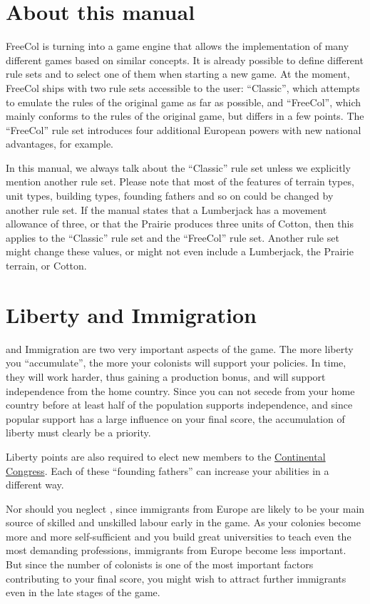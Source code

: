 \documentclass[12pt]{book}
\begin{document}
\hypertarget{About this manual}{\section{About this manual}}

FreeCol is turning into a game engine that allows the implementation
of many different games based on similar concepts. It is already
possible to define different rule sets and to select one of them when
starting a new game. At the moment, FreeCol ships with two rule sets
accessible to the user: ``Classic'', which attempts to emulate the
rules of the original game as far as possible, and ``FreeCol'', which
mainly conforms to the rules of the original game, but differs in a
few points. The ``FreeCol'' rule set introduces four additional
European powers with new national advantages, for example.

In this manual, we always talk about the ``Classic'' rule set unless
we explicitly mention another rule set. Please note that most of the
features of terrain types, unit types, building types, founding
fathers and so on could be changed by another rule set. If the manual
states that a Lumberjack has a movement allowance of three, or that
the Prairie produces three units of Cotton, then this applies to the
``Classic'' rule set and the ``FreeCol'' rule set. Another rule set
might change these values, or might not even include a Lumberjack, the
Prairie terrain, or Cotton.


\hypertarget{Liberty and Immigration}{\section{Liberty and Immigration}}

 and Immigration are two very important aspects of
the game. The more liberty you ``accumulate'', the more your colonists
will support your policies. In time, they will work harder, thus
gaining a production bonus, and will support independence from the
home country. Since you can not secede from your home country before
at least half of the population supports independence, and since
popular support has a large influence on your final score, the
accumulation of liberty must clearly be a priority.

Liberty points are also required to elect new members to the
\hyperlink{Continental Congress}{Continental Congress}. Each of these
``founding fathers'' can increase your abilities in a different way.

Nor should you neglect , since immigrants from
Europe are likely to be your main source of skilled and unskilled
labour early in the game. As your colonies become more and more
self-sufficient and you build great universities to teach even the
most demanding professions, immigrants from Europe become less
important. But since the number of colonists is one of the most
important factors contributing to your final score, you might wish to
attract further immigrants even in the late stages of the game.
\end{document}
